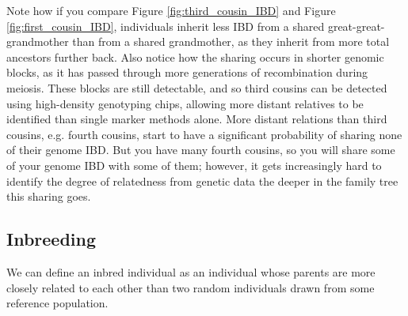 Note how if you compare Figure \ref{fig:third_cousin_IBD} and Figure \ref{fig:first_cousin_IBD}, individuals inherit less IBD from a shared great-great-grandmother than from a shared grandmother, as they inherit from more total ancestors further back. Also notice how the sharing occurs in shorter genomic blocks, as it has passed through more generations of recombination during meiosis. These blocks are still detectable, and so third cousins can be detected using high-density genotyping chips, allowing more distant relatives to be identified than single marker methods alone.  More distant relations than third cousins, e.g. fourth cousins, start to have a significant probability of sharing none of their genome IBD. But you have many fourth cousins, so you will share some of your genome IBD with some of them; however, it gets increasingly hard to identify the degree of relatedness from genetic data the deeper in the family tree this sharing goes.

\subsection{Inbreeding}
We can define an inbred individual as an individual whose parents are
more closely related to each other than two random individuals drawn
from some reference population.  \\


